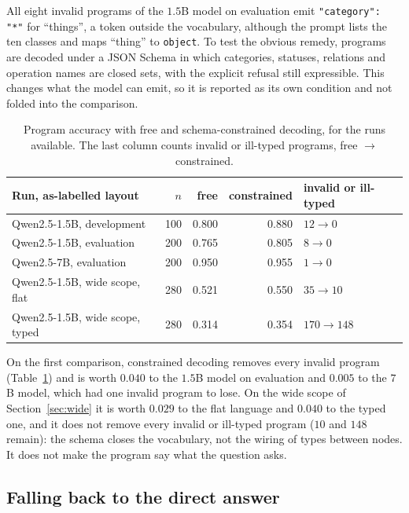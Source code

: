 \documentclass[11pt,a4paper]{article}
\newcommand{\code}[1]{\texttt{\small #1}}
\begin{document}
All eight invalid programs of the $1.5$B model on evaluation emit
\code{"category": "*"} for ``things'', a token outside the vocabulary, although the
prompt lists the ten classes and maps ``thing'' to \code{object}. To test
the obvious remedy, programs are decoded under a JSON Schema in
which categories, statuses, relations and operation names are closed sets,
with the explicit refusal still expressible. This changes what the model can
emit, so it is reported as its own condition and not folded into the
comparison.

\begin{table}[ht]
\centering
\small
\begin{tabular}{lrrrl}
\toprule
Run, as-labelled layout & $n$ & free & constrained & invalid or ill-typed \\
\midrule
Qwen2.5-1.5B, development & 100 & 0.800 & 0.880 & $12 \to 0$ \\
Qwen2.5-1.5B, evaluation  & 200 & 0.765 & 0.805 & $8 \to 0$ \\
Qwen2.5-7B, evaluation    & 200 & 0.950 & 0.955 & $1 \to 0$ \\
\midrule
Qwen2.5-1.5B, wide scope, flat  & 280 & 0.521 & 0.550 & $35 \to 10$ \\
Qwen2.5-1.5B, wide scope, typed & 280 & 0.314 & 0.354 & $170 \to 148$ \\
\bottomrule
\end{tabular}
\caption{Program accuracy with free and schema-constrained decoding, for the
runs available. The last column counts invalid or ill-typed programs, free
$\to$ constrained.}
\label{tab:constrained}
\end{table}

On the first comparison, constrained decoding removes every invalid program
(Table~\ref{tab:constrained}) and is worth $0.040$ to the $1.5$B model on
evaluation and $0.005$ to the $7$B model, which had one invalid program to
lose. On the wide scope of Section~\ref{sec:wide} it is worth $0.029$ to the
flat language and $0.040$ to the typed one, and it does not remove every
invalid or ill-typed program ($10$ and $148$ remain): the schema closes the
vocabulary, not the wiring of types between nodes. It does not make the
program say what the question asks.

\subsection{Falling back to the direct answer}
\label{sec:fallback}
\end{document}
